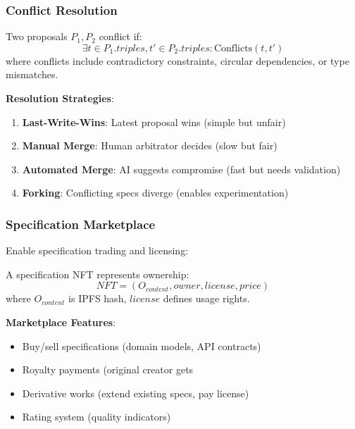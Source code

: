 \subsubsection{Conflict Resolution}

\begin{definition}
    Two proposals $P_1, P_2$ conflict if:
    \begin{equation}
        \exists t \in P_1.triples, t' \in P_2.triples : \text{Conflicts}(t, t')
    \end{equation}
    where conflicts include contradictory constraints, circular dependencies, or type mismatches.
\end{definition}

\textbf{Resolution Strategies}:
\begin{enumerate}
    \item \textbf{Last-Write-Wins}: Latest proposal wins (simple but unfair)
    \item \textbf{Manual Merge}: Human arbitrator decides (slow but fair)
    \item \textbf{Automated Merge}: AI suggests compromise (fast but needs validation)
    \item \textbf{Forking}: Conflicting specs diverge (enables experimentation)
\end{enumerate}

\subsubsection{Specification Marketplace}

Enable specification trading and licensing:

\begin{definition}
    A specification NFT represents ownership:
    \begin{equation}
        NFT = (O_{content}, owner, license, price)
    \end{equation}
    where $O_{content}$ is IPFS hash, $license$ defines usage rights.
\end{definition}

\textbf{Marketplace Features}:
\begin{itemize}
    \item Buy/sell specifications (domain models, API contracts)
    \item Royalty payments (original creator gets %
    \item Derivative works (extend existing specs, pay license)
    \item Rating system (quality indicators)
\end{itemize}

